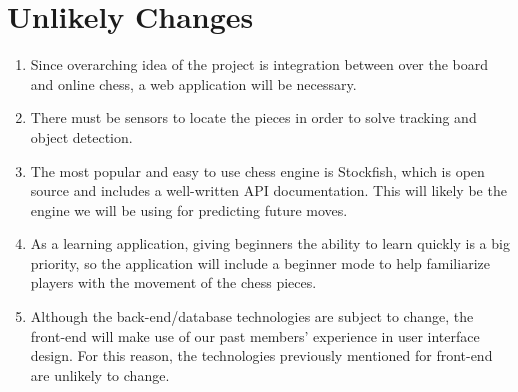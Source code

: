 \documentclass[12pt]{article}
\begin{document}
\section{Unlikely Changes}    
\noindent
\begin{enumerate}[{UC}1., leftmargin=2\parindent]
    \item Since overarching idea of the project is integration between
    over the board and online chess, a web application will be necessary.
    \item There must be sensors to locate the pieces in order to solve tracking and object detection.
    \item The most popular and easy to use chess engine is Stockfish, which is 
    open source and includes a well-written API documentation. This will likely be the engine we will be using for predicting future moves.
    \item As a learning application, giving beginners the ability to learn quickly
    is a big priority, so the application will include a beginner mode to help familiarize players with the movement of the chess pieces.
    \item Although the back-end/database technologies are subject to change,
    the front-end will make use of our past members' experience in user interface design. For this reason, the technologies
    previously mentioned for front-end are unlikely to change.
\end{enumerate}
\end{document}
